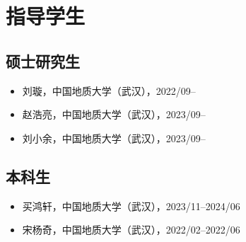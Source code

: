 \section{指导学生}

\subsection{硕士研究生}
\begin{itemize}
\item 刘璇，中国地质大学（武汉），2022/09--
\item 赵浩亮，中国地质大学（武汉），2023/09--
\item 刘小余，中国地质大学（武汉），2023/09--
\end{itemize}

\subsection{本科生}
\begin{itemize}
\item 买鸿轩，中国地质大学（武汉），2023/11--2024/06
\item 宋杨奇，中国地质大学（武汉），2022/02--2022/06
\end{itemize}

